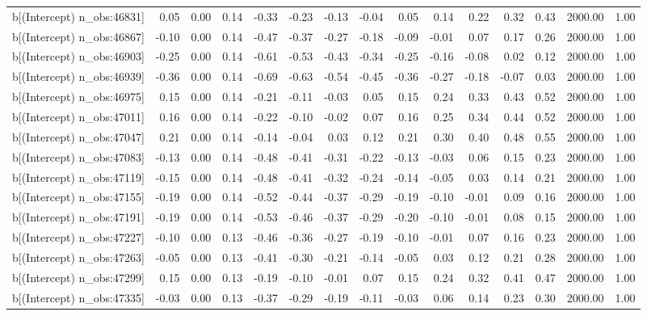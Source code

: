 \begin{table}[ht]
\begin{tabular}{rrrrrrrrrrrrrrr}
  b[(Intercept) n\_obs:46831] & 0.05 & 0.00 & 0.14 & -0.33 & -0.23 & -0.13 & -0.04 & 0.05 & 0.14 & 0.22 & 0.32 & 0.43 & 2000.00 & 1.00 \\ 
  b[(Intercept) n\_obs:46867] & -0.10 & 0.00 & 0.14 & -0.47 & -0.37 & -0.27 & -0.18 & -0.09 & -0.01 & 0.07 & 0.17 & 0.26 & 2000.00 & 1.00 \\ 
  b[(Intercept) n\_obs:46903] & -0.25 & 0.00 & 0.14 & -0.61 & -0.53 & -0.43 & -0.34 & -0.25 & -0.16 & -0.08 & 0.02 & 0.12 & 2000.00 & 1.00 \\ 
  b[(Intercept) n\_obs:46939] & -0.36 & 0.00 & 0.14 & -0.69 & -0.63 & -0.54 & -0.45 & -0.36 & -0.27 & -0.18 & -0.07 & 0.03 & 2000.00 & 1.00 \\ 
  b[(Intercept) n\_obs:46975] & 0.15 & 0.00 & 0.14 & -0.21 & -0.11 & -0.03 & 0.05 & 0.15 & 0.24 & 0.33 & 0.43 & 0.52 & 2000.00 & 1.00 \\ 
  b[(Intercept) n\_obs:47011] & 0.16 & 0.00 & 0.14 & -0.22 & -0.10 & -0.02 & 0.07 & 0.16 & 0.25 & 0.34 & 0.44 & 0.52 & 2000.00 & 1.00 \\ 
  b[(Intercept) n\_obs:47047] & 0.21 & 0.00 & 0.14 & -0.14 & -0.04 & 0.03 & 0.12 & 0.21 & 0.30 & 0.40 & 0.48 & 0.55 & 2000.00 & 1.00 \\ 
  b[(Intercept) n\_obs:47083] & -0.13 & 0.00 & 0.14 & -0.48 & -0.41 & -0.31 & -0.22 & -0.13 & -0.03 & 0.06 & 0.15 & 0.23 & 2000.00 & 1.00 \\ 
  b[(Intercept) n\_obs:47119] & -0.15 & 0.00 & 0.14 & -0.48 & -0.41 & -0.32 & -0.24 & -0.14 & -0.05 & 0.03 & 0.14 & 0.21 & 2000.00 & 1.00 \\ 
  b[(Intercept) n\_obs:47155] & -0.19 & 0.00 & 0.14 & -0.52 & -0.44 & -0.37 & -0.29 & -0.19 & -0.10 & -0.01 & 0.09 & 0.16 & 2000.00 & 1.00 \\ 
  b[(Intercept) n\_obs:47191] & -0.19 & 0.00 & 0.14 & -0.53 & -0.46 & -0.37 & -0.29 & -0.20 & -0.10 & -0.01 & 0.08 & 0.15 & 2000.00 & 1.00 \\ 
  b[(Intercept) n\_obs:47227] & -0.10 & 0.00 & 0.13 & -0.46 & -0.36 & -0.27 & -0.19 & -0.10 & -0.01 & 0.07 & 0.16 & 0.23 & 2000.00 & 1.00 \\ 
  b[(Intercept) n\_obs:47263] & -0.05 & 0.00 & 0.13 & -0.41 & -0.30 & -0.21 & -0.14 & -0.05 & 0.03 & 0.12 & 0.21 & 0.28 & 2000.00 & 1.00 \\ 
  b[(Intercept) n\_obs:47299] & 0.15 & 0.00 & 0.13 & -0.19 & -0.10 & -0.01 & 0.07 & 0.15 & 0.24 & 0.32 & 0.41 & 0.47 & 2000.00 & 1.00 \\ 
  b[(Intercept) n\_obs:47335] & -0.03 & 0.00 & 0.13 & -0.37 & -0.29 & -0.19 & -0.11 & -0.03 & 0.06 & 0.14 & 0.23 & 0.30 & 2000.00 & 1.00 \\ 

\end{tabular}
\end{table}
